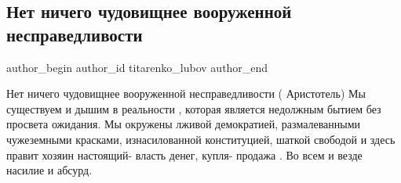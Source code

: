  
 
 
 
 
 
\subsection{Нет ничего чудовищнее вооруженной несправедливости}
\label{sec:17_02_2022.fb.titarenko_lubov.1.nespravedlivost}
 
\ifcmt
 author_begin
   author_id titarenko_lubov
 author_end
\fi

Нет ничего чудовищнее вооруженной несправедливости
( Аристотель)
Мы существуем и дышим в реальности , которая является недолжным бытием  без просвета ожидания.
Мы окружены  лживой демократией, размалеванными чужеземными красками,  изнасилованной конституцией,  шаткой свободой и здесь правит  хозяин настоящий- власть денег, купля- продажа .
Во всем  и везде насилие и абсурд.



